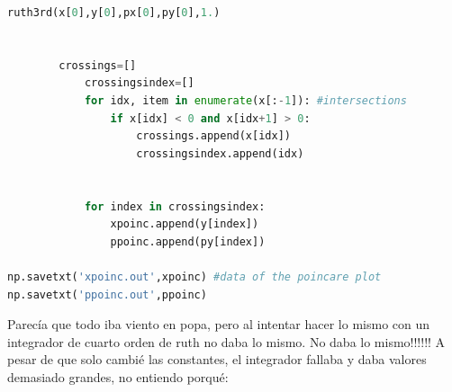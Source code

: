\documentclass[idxtotoc,hyperref,openany]{labbook} %
\begin{document}
\begin{lstlisting}[language=Python]
            ruth3rd(x[0],y[0],px[0],py[0],1.)       
        

	    crossings=[]
            crossingsindex=[]    
            for idx, item in enumerate(x[:-1]): #intersections
                if x[idx] < 0 and x[idx+1] > 0:
                    crossings.append(x[idx])
                    crossingsindex.append(idx)
                
            
            for index in crossingsindex:
                xpoinc.append(y[index])
                ppoinc.append(py[index])

np.savetxt('xpoinc.out',xpoinc) #data of the poincare plot
np.savetxt('ppoinc.out',ppoinc)
\end{lstlisting}

Parecía que todo iba viento en popa, pero al intentar hacer lo mismo con un integrador de cuarto orden de ruth no daba lo mismo. No daba lo mismo!!!!!! A pesar de que solo cambié las constantes, el integrador fallaba y daba valores demasiado grandes, no entiendo porqué:
\end{document}
